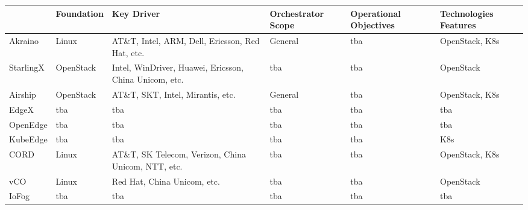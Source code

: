 \begin{turn}{90}
    \begin{tabular}{ | p{2cm} | l | p{5cm} | p{2.5cm} | p{2.5cm} | p{2.5cm} | }
    \hline
      & Foundation & Key Driver & Orchestrator Scope & Operational Objectives & Technologies Features\\ \hline
    Akraino & Linux & AT\&T, Intel, ARM, Dell, Ericsson, Red Hat, etc. & General & tba & OpenStack, K8s \\ \hline

    StarlingX & OpenStack & Intel, WinDriver, Huawei,
    Ericsson, China Unicom, etc. & tba & tba & OpenStack \\ \hline

    Airship & OpenStack &  AT\&T, SKT,
    Intel, Mirantis, etc. & General & tba & OpenStack, K8s \\ \hline

    EdgeX & tba & tba & tba & tba & tba \\ \hline

    OpenEdge & tba & tba & tba & tba & tba \\ \hline

    KubeEdge & tba & tba & tba & tba & K8s \\ \hline

    CORD & Linux & AT\&T, SK Telecom,
    Verizon, China Unicom, NTT, etc. & tba & tba & OpenStack, K8s \\ \hline

    vCO & Linux & Red Hat, China Unicom, etc. & tba & tba & OpenStack \\ \hline

    IoFog & tba & tba & tba & tba & tba \\ \hline
    
    \end{tabular}
\end{turn}
